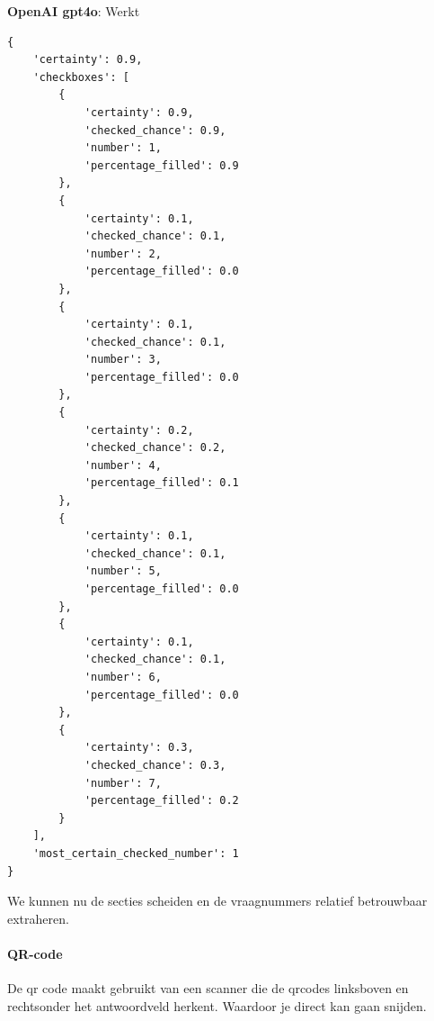 \documentclass[12pt]{article}
\begin{document}
\begin{samepage}
    
\textbf{OpenAI gpt4o}: Werkt
\begin{listing}[H]
    
    \begin{verbatim}
{
    'certainty': 0.9, 
    'checkboxes': [
        {
            'certainty': 0.9, 
            'checked_chance': 0.9, 
            'number': 1, 
            'percentage_filled': 0.9
        }, 
        {
            'certainty': 0.1, 
            'checked_chance': 0.1, 
            'number': 2, 
            'percentage_filled': 0.0
        }, 
        {
            'certainty': 0.1, 
            'checked_chance': 0.1, 
            'number': 3, 
            'percentage_filled': 0.0
        }, 
        {
            'certainty': 0.2, 
            'checked_chance': 0.2, 
            'number': 4, 
            'percentage_filled': 0.1
        }, 
        {
            'certainty': 0.1, 
            'checked_chance': 0.1, 
            'number': 5, 
            'percentage_filled': 0.0
        }, 
        {
            'certainty': 0.1, 
            'checked_chance': 0.1, 
            'number': 6, 
            'percentage_filled': 0.0
        },
        {
            'certainty': 0.3, 
            'checked_chance': 0.3, 
            'number': 7, 
            'percentage_filled': 0.2
        }
    ], 
    'most_certain_checked_number': 1
}
\end{verbatim}
\end{listing}
\noindent We kunnen nu de secties scheiden en de vraagnummers relatief betrouwbaar extraheren.
\paragraph*{QR-code}De qr code maakt gebruikt van een scanner die de qrcodes linksboven en rechtsonder het antwoordveld herkent. Waardoor je direct kan gaan snijden.\\
\end{samepage}


\pagebreak
\end{document}
